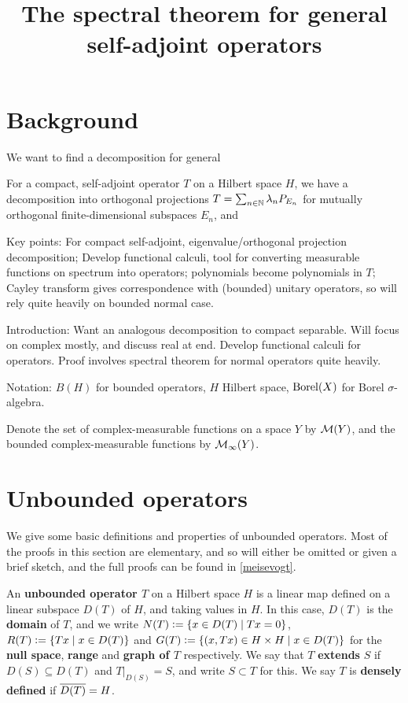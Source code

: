 \documentclass[10pt]{amsart}
\title{The spectral theorem for general self-adjoint operators}
\begin{document}
\maketitle
\section{Background}
We want to find a decomposition for general 



For a compact, self-adjoint operator $T$ on a Hilbert space $H$, we have a decomposition into orthogonal projections $T = \sum_{n \in \mathbb{N}}\lambda_n P_{E_n}$ for mutually orthogonal finite-dimensional subspaces $E_n$, and 

Key points: For compact self-adjoint, eigenvalue/orthogonal projection decomposition; Develop functional calculi, tool for converting measurable functions on spectrum into operators; polynomials become polynomials in $T$; Cayley transform gives correspondence with (bounded) unitary operators, so will rely quite heavily on bounded normal case.

Introduction: Want an analogous decomposition to compact separable. Will focus on complex mostly, and discuss real at end. Develop functional calculi for operators. Proof involves spectral theorem for normal operators quite heavily.

Notation: $B(H)$ for bounded operators, $H$ Hilbert space, $\operatorname{Borel}(X)$ for Borel $\sigma$-algebra. 

Denote the set of complex-measurable functions on a space $Y$ by $\mathcal{M}(Y)$, and the bounded complex-measurable functions by $\mathcal{M}_\infty(Y)$. 
\section{Unbounded operators}
We give some basic definitions and properties of unbounded operators. Most of the proofs in this section are elementary, and so will either be omitted or given a brief sketch, and the full proofs can be found in \ref{meisevogt}.

An \textbf{unbounded operator $T$} on a Hilbert space $H$ is a linear map defined on a linear subspace $D(T)$ of $H$, and taking values in $H$. In this case, $D(T)$ is the \textbf{domain} of $T$, and we write $N(T) \vcentcolon= \left\{  x \in D(T) \mid Tx = 0  \right\}$, $R(T) \vcentcolon= \left\{  Tx \mid x \in D(T)  \right\}$ and $G(T) \vcentcolon= \left\{  (x, Tx) \in H \times H \mid x \in D(T)  \right\}$ for the \textbf{null space}, \textbf{range} and \textbf{graph of $T$} respectively. We say that $T$ \textbf{extends} $S$ if $D(S) \subseteq D(T)$ and $T|_{D(S)} = S$, and write $S \subset T$ for this. We say $T$ is \textbf{densely defined} if $\overline{D(T)} = H$.
\end{document}
